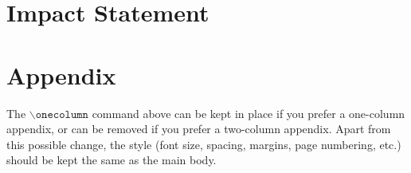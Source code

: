\documentclass{article}
\theoremstyle{plain}
\theoremstyle{definition}
\theoremstyle{remark}
\begin{document}



\section*{Impact Statement}
\label{Imapact Statement}

\nocite{*}




\newpage
\appendix
\onecolumn
\section{Appendix}

The $\mathtt{\backslash onecolumn}$ command above can be kept in place if you prefer a one-column appendix, or can be removed if you prefer a two-column appendix.  Apart from this possible change, the style (font size, spacing, margins, page numbering, etc.) should be kept the same as the main body.
\end{document}
